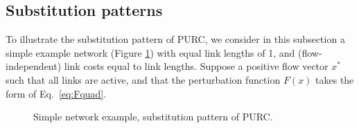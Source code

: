 \documentclass[a4paper,11pt]{article}
\begin{document}









\subsection{Substitution patterns }\label{sec:complementarity}

To illustrate the substitution pattern of PURC, we consider in this subsection a simple example network (Figure \ref{fig:1_complementarity_example}) with equal link lengths of 1, and (flow-independent) link costs equal to link lengths. Suppose a positive flow vector $x^*$ such that all links are active, and that the perturbation function $F(x)$ takes the form of Eq.~\eqref{eq:Fquad}.

\begin{figure}[h]
  \centering
{}
\caption{Simple network example, substitution pattern of PURC.}\label{fig:1_complementarity_example}
\end{figure}
\end{document}
